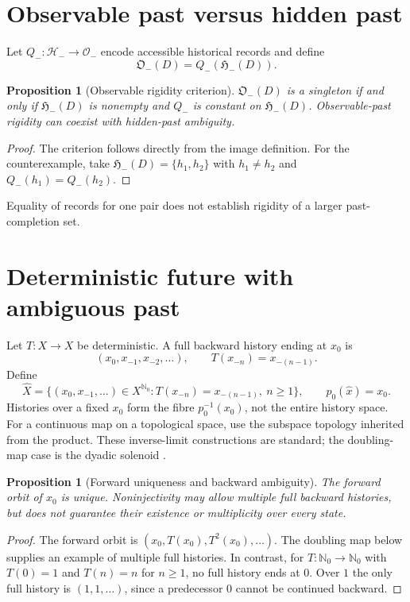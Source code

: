 \documentclass[11pt]{article}
\newtheorem{proposition}[definition]{Proposition}
\newcommand{\Hminus}{\mathcal H_-}
\newcommand{\Pcal}{\mathfrak H_-}
\begin{document}
\section{Observable past versus hidden past}
Let $Q_-:\Hminus\to\mathcal O_-$ encode accessible historical records and define
\[
\mathfrak O_-(D)=Q_-(\Pcal(D)).
\]
\begin{proposition}[Observable rigidity criterion]
\label{prop:observable-rigidity}
$\mathfrak O_-(D)$ is a singleton if and only if $\Pcal(D)$ is
nonempty and $Q_-$ is constant on $\Pcal(D)$. Observable-past rigidity
can coexist with hidden-past ambiguity.
\end{proposition}
\begin{proof}
The criterion follows directly from the image definition. For the
counterexample, take $\Pcal(D)=\{h_1,h_2\}$ with $h_1\ne h_2$ and
$Q_-(h_1)=Q_-(h_2)$.
\end{proof}
Equality of records for one pair does not establish rigidity of a
larger past-completion set.

\section{Deterministic future with ambiguous past}
Let $T:X\to X$ be deterministic. A full backward history ending at $x_0$ is
\[
(x_0,x_{-1},x_{-2},\ldots),
\qquad T(x_{-n})=x_{-(n-1)}.
\]
Define
\[
\widehat X=\{(x_0,x_{-1},\ldots)\in X^{\mathbb N_0}:
T(x_{-n})=x_{-(n-1)},\ n\ge1\},
\qquad p_0(\widehat x)=x_0.
\]
Histories over a fixed $x_0$ form the fibre $p_0^{-1}(x_0)$,
not the entire history space. For a continuous map on a topological
space, use the subspace topology inherited from the product.
These inverse-limit constructions are standard; the doubling-map
case is the dyadic solenoid \cite[Section 1]{ClarkFokkink2004}.
\begin{proposition}[Forward uniqueness and backward ambiguity]
\label{prop:forward-backward}
The forward orbit of $x_0$ is unique. Noninjectivity may allow
multiple full backward histories, but does not guarantee their
existence or multiplicity over every state.
\end{proposition}
\begin{proof}
The forward orbit is $(x_0,T(x_0),T^2(x_0),\ldots)$.
The doubling map below supplies an example of multiple full histories.
In contrast, for $T:\mathbb N_0\to\mathbb N_0$ with $T(0)=1$ and
$T(n)=n$ for $n\ge1$, no full history ends at $0$. Over $1$ the only
full history is $(1,1,\ldots)$, since a predecessor $0$ cannot be
continued backward.
\end{proof}
\end{document}
